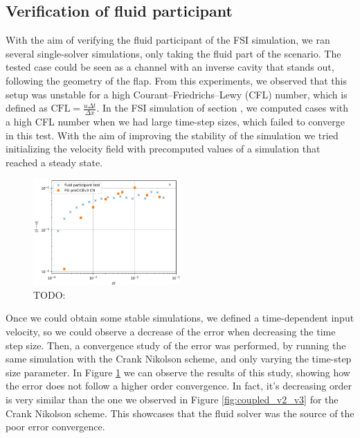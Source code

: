 \documentclass[
  english,        %
  font=times,     %
  onecolumn,      %
]{tumarticle}
\begin{document}
\subsection{Verification of fluid participant} \label{sec:fluid-part}
With the aim of verifying the fluid participant of the FSI simulation, we ran several single-solver simulations, only taking the fluid part of the scenario. The tested case could be seen as a channel with an inverse cavity that stands out, following the geometry of the flap. From this experiments, we observed that this setup was unstable for a high Courant–Friedrichs–Lewy (CFL) number, which is defined as $\text{CFL} = \frac{u \Delta t}{\Delta x}$. In the FSI simulation of section \label{sec:FSI}, we computed cases with a high CFL number when we had large time-step sizes, which failed to converge in this test. With the aim of improving the stability of the simulation we tried initializing the velocity field with precomputed values of a simulation that reached a steady state.

\begin{figure}[!ht]
    \centering
    \includegraphics[width=0.5\textwidth]{resources/fluid_participant_test.png}
    \caption{TODO: }
    \label{fig:fluid_test}
\end{figure}

Once we could obtain some stable simulations, we defined a time-dependent input velocity, so we could observe a decrease of the error when decreasing the time step size. Then, a convergence study of the error was performed, by running the same simulation with the Crank Nikolson scheme, and only varying the time-step size parameter. In Figure \ref{fig:fluid_test} we can observe the results of this study, showing how the error does not follow a higher order convergence. In fact, it's decreasing order is very similar than the one we observed in Figure \ref{fig:coupled_v2_v3} for the Crank Nikolson scheme. This showcases that the fluid solver was the source of the poor error convergence.
\end{document}
